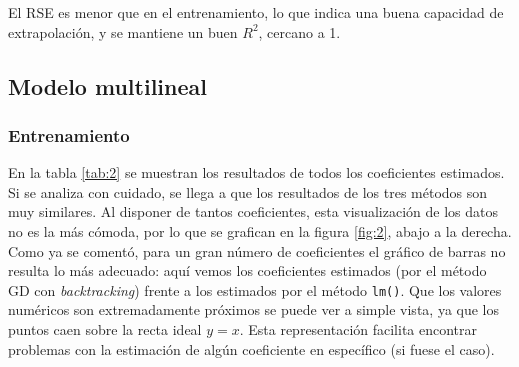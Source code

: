 \documentclass[11pt]{opticajnl}
\begin{document}
El RSE es menor que en el entrenamiento, lo que indica una buena capacidad de extrapolación, y se mantiene un buen $R^2$, cercano a 1. 

\subsection{Modelo multilineal}

\subsubsection{Entrenamiento}

En la tabla \ref{tab:2} se muestran los resultados de todos los coeficientes estimados. Si se analiza con cuidado, se llega a que los resultados de los tres métodos son muy similares. Al disponer de tantos coeficientes, esta visualización de los datos no es la más cómoda, por lo que se grafican en la figura \ref{fig:2}, abajo a la derecha. Como ya se comentó, para un gran número de coeficientes el gráfico de barras no resulta lo más adecuado: aquí vemos los coeficientes estimados (por el método GD con \textit{backtracking}) frente a los estimados por el método \texttt{lm()}. Que los valores numéricos son extremadamente próximos se puede ver a simple vista, ya que los puntos caen sobre la recta ideal $y=x$. Esta representación facilita encontrar problemas con la estimación de algún coeficiente en específico (si fuese el caso).

\begin{table}[h]
    \caption{Coeficientes estimados para el modelo de regresión multilineal durante el entrenamiento.}
    \label{tab:2}
\end{table}
\end{document}
